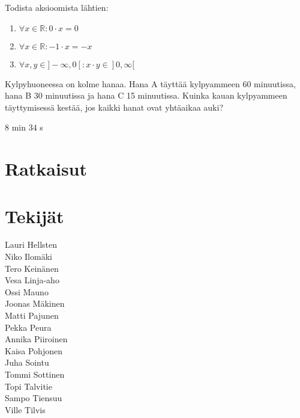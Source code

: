 \begin{tehtava}
Todista aksioomista lähtien:
\begin{enumerate}[(1)]
\item $\forall x \in \mathbb{R}: 0 \cdot x = 0$
\item $\forall x \in \mathbb{R}: -1 \cdot x = -x$
\item $\forall x, y \in ]-\infty,0[: x \cdot y \in ]0,\infty[$
\end{enumerate}
\begin{vastaus}
\begin{enumerate}[(1)]
\end{enumerate}
\end{vastaus}
\end{tehtava}

\begin{tehtava}
Kylpyhuoneessa on kolme hanaa. Hana A täyttää kylpyammeen 60 minuutissa, hana B 30 minuutissa ja hana C 15 minuutissa. Kuinka kauan kylpyammeen täyttymisessä kestää, jos kaikki hanat ovat yhtäaikaa auki?
\begin{vastaus}
$8$ min $34$ s
\end{vastaus}
\end{tehtava}

\chapter{Ratkaisut}


\chapter{Tekijät}

Lauri Hellsten\\
Niko Ilomäki\\
Tero Keinänen\\
Vesa Linja-aho\\
Ossi Mauno\\
Joonas Mäkinen\\
Matti Pajunen\\
Pekka Peura\\
Annika Piiroinen\\
Kaisa Pohjonen\\
Juha Sointu\\
Tommi Sottinen\\
Topi Talvitie\\
Sampo Tiensuu\\
Ville Tilvis